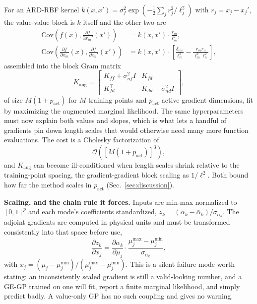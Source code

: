 \documentclass[]{ANStopical}
\begin{document}
For an ARD-RBF kernel $k(x,x')=\sigma_f^2\exp\!\left(-\tfrac12\sum_j r_j^2/\ell_j^2\right)$ with $r_j=x_j-x_j'$, the value-value block is $k$ itself and the other two are
\begin{align}
    \mathrm{Cov}\!\left(f(x), \frac{\partial f}{\partial x_m'}(x')\right) &= k(x,x')\cdot \frac{r_m}{\ell_m^2}, \\
    \mathrm{Cov}\!\left(\frac{\partial f}{\partial x_m}(x), \frac{\partial f}{\partial x_n'}(x')\right) &= k(x,x')\cdot\left[\frac{\delta_{mn}}{\ell_m^2} - \frac{r_m r_n}{\ell_m^2\ell_n^2}\right],
\end{align}
assembled into the block Gram matrix
\begin{equation}
    K_{\mathrm{aug}} = \begin{bmatrix} K_{\textit{ff}}+\sigma_{\textit{nf}}^2 I & K_{\textit{fd}} \\ K_{\textit{fd}}^\top & K_{\textit{dd}}+\sigma_{\textit{nd}}^2 I \end{bmatrix},
\end{equation}
of size $M(1+p_{\mathrm{act}})$ for $M$ training points and $p_{\mathrm{act}}$ active gradient dimensions, fit by maximizing the augmented marginal likelihood. The same hyperparameters must now explain both values and slopes, which is what lets a handful of gradients pin down length scales that would otherwise need many more function evaluations. The cost is a Cholesky factorization of
\begin{equation}
    \mathcal{O}\!\left(\left[M\left(1+p_{\mathrm{act}}\right)\right]^{3}\right),
    \label{eq:cost}
\end{equation}
and $K_{\mathrm{aug}}$ can become ill-conditioned when length scales shrink relative to the training-point spacing, the gradient-gradient block scaling as $1/\ell^2$. Both bound how far the method scales in $p_{\mathrm{act}}$ (Sec.~\ref{sec:discussion}).

\textbf{Scaling, and the chain rule it forces.} Inputs are min-max normalized to $[0,1]^p$ and each mode's coefficients standardized, $z_k=(\alpha_k-\bar\alpha_k)/\sigma_{\alpha_k}$. The adjoint gradients are computed in physical units and must be transformed consistently into that space before use,
\begin{equation}
    \frac{\partial z_k}{\partial x_j} = \frac{\partial\alpha_k}{\partial\mu_j}\cdot
    \frac{\mu_j^{\max}-\mu_j^{\min}}{\sigma_{\alpha_k}},
    \label{eq:chainrule}
\end{equation}
with $x_j=(\mu_j-\mu_j^{\min})/(\mu_j^{\max}-\mu_j^{\min})$. This is a silent failure mode worth stating: an inconsistently scaled gradient is still a valid-looking number, and a GE-GP trained on one will fit, report a finite marginal likelihood, and simply predict badly. A value-only GP has no such coupling and gives no warning.
\end{document}
